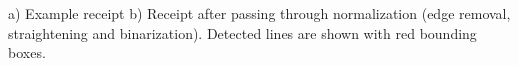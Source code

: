 a) Example receipt b) Receipt after passing through normalization (edge removal, straightening and binarization). Detected lines are shown with red bounding boxes. 